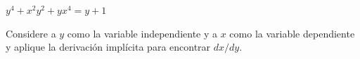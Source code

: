 \setcounter{enumi}{20}
\item $y^4 + x^2y^2 + yx^4 = y + 1$
\par
Considere a $y$ como la variable independiente y a $x$ como la variable dependiente y aplique la derivación implícita para encontrar $dx/dy$.

